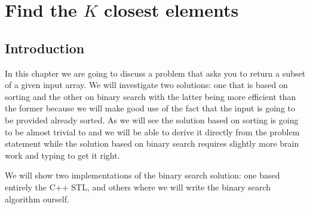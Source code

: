 %

\chapter{Find the $K$ closest elements}
\label{ch:find_k_closest_in_array}
\section*{Introduction}
In this chapter we are going to discuss a problem that asks you to return a subset of a given input  array. 
We will investigate two solutions: one that is based on sorting and the other on binary search with the latter being more efficient than the former because we will make good use of the fact
that the input is going to be provided already sorted. As we will see the solution based on sorting is going to be almost trivial to and we will be able to derive it
directly from the problem statement while the solution based on binary search requires slightly more brain work and typing to get it right. 

We will show  two implementations of the binary search solution: one  based entirely  the C++ STL, and others where we will write the binary search algorithm ourself. 


